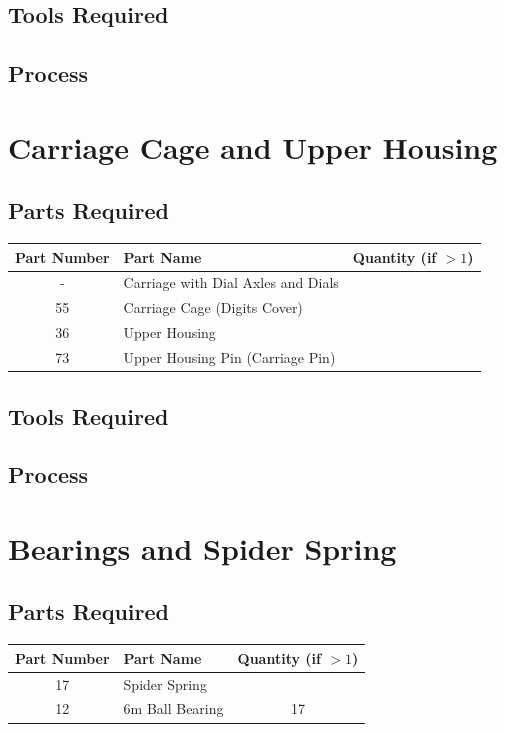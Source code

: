 \documentclass{article}
\begin{document}
\subsection{Tools Required}

\subsection{Process}


\newpage
\section{Carriage Cage and Upper Housing}
\subsection{Parts Required}
\begin{table}[h!]
	\centering
	\begin{tabular}{clc}
		Part Number & Part Name & Quantity (if $>1$) \\ \hline
		- & Carriage with Dial Axles and Dials & \\
		55 & Carriage Cage (Digits Cover) & \\
		36 & Upper Housing & \\
		73 & Upper Housing Pin (Carriage Pin) & 
	\end{tabular}
\end{table}

\subsection{Tools Required}

\subsection{Process}


\newpage
\section{Bearings and Spider Spring}
\subsection{Parts Required}
\begin{table}[h!]
	\centering
	\begin{tabular}{clc}
		Part Number & Part Name & Quantity (if $>1$) \\ \hline
		 17 & Spider Spring & \\ \hline \hline 
		 12 & 6m Ball Bearing & 17 
	\end{tabular}
\end{table}
\end{document}
